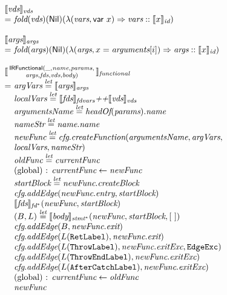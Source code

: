\[\begin{array}{l@{}l@{~}l}
\lefteqn{\transfun{\emph{vds}}_{\emph{vds}}}\\
 & = &
\fold(\emph{vds})(\Nil)(\lambda(\emph{vars}, \irvar{x})\Rightarrow \emph{vars} :: \transfun{x}_{\emph{id}})\\
& & \\

\lefteqn{\transfun{\emph{args}}_{\emph{args}}}\\
 & = &
\fold(\emph{args})(\Nil)(\lambda(\emph{args}, x = \emph{arguments}[i]) \Rightarrow \emph{args} :: \transfun{x}_{\emph{id}})\\
& & \\

\lefteqn{\transfun{\irfunctionalsmall{\_}{\emph{name}}{\emph{params}}{\emph{args}}{\emph{fds}}{\emph{vds}}{\emph{body}}}_{\emph{functional}}}\\
& = & \emph{argVars} \letval \transfun{\emph{args}}_{\emph{args}}\\
& & \emph{localVars} \letval \transfun{\emph{fds}}_{\emph{fdvars}} \emph{++} \transfun{\emph{vds}}_{\emph{vds}}\\
& & \emph{argumentsName} \letval \headOf(\emph{params}).\emph{name}\\
& & \emph{nameStr} \letval \emph{name}.\emph{name}\\
& & \emph{newFunc} \letval \emph{cfg}.\emph{createFunction}(\emph{argumentsName}, \emph{argVars},\\
& & \emph{localVars}, \emph{nameStr})\\
& & \emph{oldFunc} \letval \emph{currentFunc}\\
& & \text{(global) : } \emph{currentFunc} \leftarrow \emph{newFunc}\\
& & \emph{startBlock} \letval \emph{newFunc}.\emph{createBlock}\\
& & \emph{cfg}.\emph{addEdge}(\emph{newFunc}.\emph{entry}, \emph{startBlock})\\
& & \transfun{\emph{fds}}_{\emph{fd}^{*}}(\emph{newFunc}, \emph{startBlock})\\
& & (B, L) \letval \transfun{\emph{body}}_{\emph{stmt}^{*}}(\emph{newFunc}, \emph{startBlock}, [\ ])\\
& & \emph{cfg}.\emph{addEdge}(B, \emph{newFunc}.\emph{exit})\\
& & \emph{cfg}.\emph{addEdge}(L(\TT{RetLabel}), \emph{newFunc}.\emph{exit})\\
& & \emph{cfg}.\emph{addEdge}(L(\TT{ThrowLabel}), \emph{newFunc}.\emph{exitExc}, \EdgeExc)\\
& & \emph{cfg}.\emph{addEdge}(L(\TT{ThrowEndLabel}), \emph{newFunc}.\emph{exitExc})\\
& & \emph{cfg}.\emph{addEdge}(L(\TT{AfterCatchLabel}), \emph{newFunc}.\emph{exitExc})\\
& & \text{(global) : } \emph{currentFunc} \leftarrow \emph{oldFunc}\\
& & \emph{newFunc}\\
& & \\
\end{array}
\]

